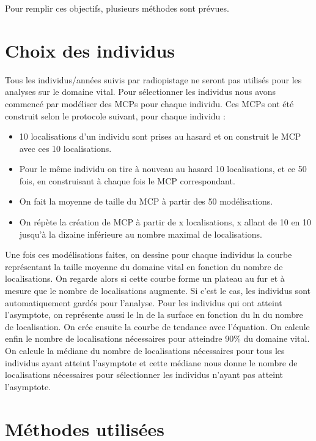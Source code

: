 \documentclass[
  letterpaper,
  DIV=11,
  numbers=noendperiod]{scrreprt}
\providecommand{\tightlist}{%
  \setlength{\itemsep}{0pt}\setlength{\parskip}{0pt}}\usepackage{longtable,booktabs,array}
\begin{document}
Pour remplir ces objectifs, plusieurs méthodes sont prévues.

\section{Choix des individus}\label{choix-des-individus}

Tous les individus/années suivis par radiopistage ne seront pas utilisés
pour les analyses sur le domaine vital. Pour sélectionner les individus
nous avons commencé par modéliser des MCPs pour chaque individu. Ces
MCPs ont été construit selon le protocole suivant, pour chaque individu
:

\begin{itemize}
\tightlist
\item
  10 localisations d'un individu sont prises au hasard et on construit
  le MCP avec ces 10 localisations.
\item
  Pour le même individu on tire à nouveau au hasard 10 localisations, et
  ce 50 fois, en construisant à chaque fois le MCP correspondant.
\item
  On fait la moyenne de taille du MCP à partir des 50 modélisations.
\item
  On répète la création de MCP à partir de x localisations, x allant de
  10 en 10 jusqu'à la dizaine inférieure au nombre maximal de
  localisations.
\end{itemize}

Une fois ces modélisations faites, on dessine pour chaque individus la
courbe représentant la taille moyenne du domaine vital en fonction du
nombre de localisations. On regarde alors si cette courbe forme un
plateau au fur et à mesure que le nombre de localisations augmente. Si
c'est le cas, les individus sont automatiquement gardés pour l'analyse.
Pour les individus qui ont atteint l'asymptote, on représente aussi le
ln de la surface en fonction du ln du nombre de localisation. On crée
ensuite la courbe de tendance avec l'équation. On calcule enfin le
nombre de localisations nécessaires pour atteindre 90\% du domaine
vital. On calcule la médiane du nombre de localisations nécessaires pour
tous les individus ayant atteint l'asymptote et cette médiane nous donne
le nombre de localisations nécessaires pour sélectionner les individus
n'ayant pas atteint l'asymptote.

\section{Méthodes utilisées}\label{muxe9thodes-utilisuxe9es}
\end{document}
